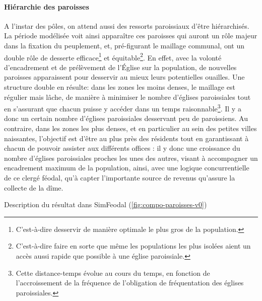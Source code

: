 \paragraph{Hiérarchie des paroisses}

A l'instar des pôles, on attend aussi des ressorts paroissiaux d'être hiérarchisés. La période modélisée voit ainsi apparaître ces paroisses qui auront un rôle majeur dans la fixation du peuplement, et, pré-figurant le maillage communal, ont un double rôle de desserte efficace\footnote{C'est-à-dire desservir de manière optimale le plus gros de la population.} et équitable\footnote{C'est-à-dire faire en sorte que même les populations les plus isolées aient un accès aussi rapide que possible à une église paroissiale.}.
En effet, avec la volonté d'encadrement et de prélèvement de l'Église sur la population, de nouvelles paroisses apparaissent pour desservir au mieux leurs potentielles ouailles.
Une structure double en résulte: dans les zones les moins denses, le maillage est régulier mais lâche, de manière à minimiser le nombre d'églises paroissiales tout en s'assurant que chacun puisse y accéder dans un temps raisonnable\footnote{Cette distance-temps évolue au cours du temps, en fonction de l'accroissement de la fréquence de l'obligation de fréquentation des églises paroissiales.}. Il y a donc un certain nombre d'églises paroissiales desservant peu de paroissiens.
Au contraire, dans les zones les plus denses, et en particulier au sein des petites villes naissantes, l'objectif est d'être au plus près des résidents tout en garantissant à chacun de pouvoir assister aux différents offices : il y donc une croissance du nombre d'églises paroissiales proches les unes des autres, visant à accompagner un encadrement maximum de la population, ainsi, avec une logique concurrentielle de ce clergé féodal, qu'à capter l'importante source de revenus qu'assure la collecte de la dîme.



\begin{mdframed}[backgroundcolor=gray!10,footnoteinside=false]
	Description du résultat dans SimFeodal
	(\cref{fig:compo-paroisses-v0})
\end{mdframed}

